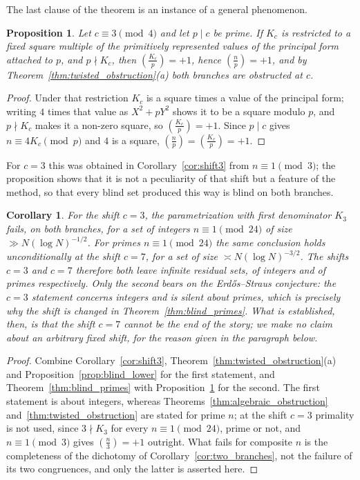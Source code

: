 \documentclass[11pt, a4paper]{article}
\theoremstyle{plain}
\newtheorem{corollary}[theorem]{Corollary}
\newtheorem{proposition}[theorem]{Proposition}
\theoremstyle{definition}
\newcommand{\leg}[2]{\left(\frac{#1}{#2}\right)}
\begin{document}
The last clause of the theorem is an instance of a general phenomenon.

\begin{proposition}\label{prop:auto_residue}
Let $c\equiv3\pmod4$ and let $p\mid c$ be prime. If $K_c$ is restricted to a fixed square multiple of the primitively represented values of the principal form attached to $p$, and $p\nmid K_c$, then $\leg{K_c}{p}=+1$, hence $\leg np=+1$, and by Theorem~\ref{thm:twisted_obstruction}(a) both branches are obstructed at $c$.
\end{proposition}
\begin{proof}
Under that restriction $K_c$ is a square times a value of the principal form; writing $4$ times that value as $X^{2}+pY^{2}$ shows it to be a square modulo $p$, and $p\nmid K_c$ makes it a non-zero square, so $\leg{K_c}{p}=+1$. Since $p\mid c$ gives $n\equiv4K_c\pmod p$ and $4$ is a square, $\leg np=\leg{K_c}{p}=+1$.
\end{proof}

For $c=3$ this was obtained in Corollary~\ref{cor:shift3} from $n\equiv1\pmod3$; the proposition shows that it is not a peculiarity of that shift but a feature of the method, so that every blind set produced this way is blind on both branches.

\begin{corollary}\label{cor:analytic_barrier}
For the shift $c=3$, the parametrization with first denominator $K_3$ fails, on both branches, for a set of \emph{integers} $n\equiv1\pmod{24}$ of size $\gg N(\log N)^{-1/2}$. For \emph{primes} $n\equiv1\pmod{24}$ the same conclusion holds unconditionally at the shift $c=7$, for a set of size $\asymp N(\log N)^{-3/2}$. The shifts $c=3$ and $c=7$ therefore both leave infinite residual sets, of integers and of primes respectively. Only the second bears on the Erd\H{o}s--Straus conjecture: the $c=3$ statement concerns integers and is silent about primes, which is precisely why the shift is changed in Theorem~\ref{thm:blind_primes}. What is established, then, is that \emph{the} shift $c=7$ cannot be the end of the story; we make no claim about an arbitrary fixed shift, for the reason given in the paragraph below.
\end{corollary}
\begin{proof}
Combine Corollary~\ref{cor:shift3}, Theorem~\ref{thm:twisted_obstruction}(a) and Proposition~\ref{prop:blind_lower} for the first statement, and Theorem~\ref{thm:blind_primes} with Proposition~\ref{prop:auto_residue} for the second. The first statement is about integers, whereas Theorems~\ref{thm:algebraic_obstruction} and~\ref{thm:twisted_obstruction} are stated for prime $n$; at the shift $c=3$ primality is not used, since $3\nmid K_3$ for every $n\equiv1\pmod{24}$, prime or not, and $n\equiv1\pmod3$ gives $\leg n3=+1$ outright. What fails for composite $n$ is the completeness of the dichotomy of Corollary~\ref{cor:two_branches}, not the failure of its two congruences, and only the latter is asserted here.
\end{proof}
\end{document}

